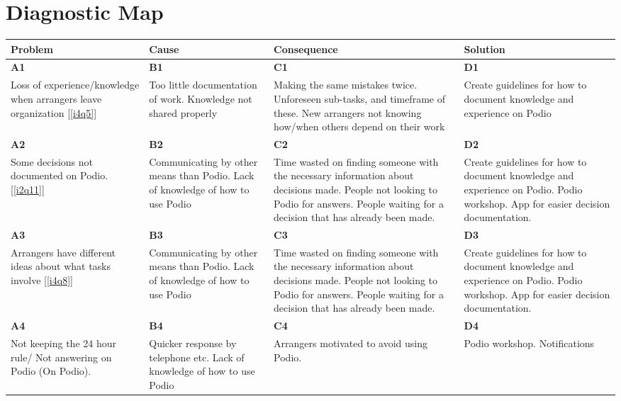 \section{Diagnostic Map} %
\label{sec:diagnostic_map}

\begin{tabular}{| p{3.5 cm} | p{3.5 cm} | p{3.5 cm} | p{3.5 cm} |}
  \hline                        
  \textbf{Problem} & \textbf{Cause} & \textbf{Consequence} & \textbf{Solution} \\ \hline
  \textbf{A1} & \textbf{B1} & \textbf{C1} & \textbf{D1} \\ 
  Loss of experience/knowledge when arrangers leave organization [\ref{i4q5}]
  & Too little documentation of work. Knowledge not shared properly 
  & Making the same mistakes twice. Unforeseen sub-tasks, and timeframe of these. New arrangers not knowing how/when others depend on their work
  &	Create guidelines for how to document knowledge and experience on Podio \\
  \hline
  \textbf{A2} & \textbf{B2} & \textbf{C2} & \textbf{D2} \\ 
  Some decisions not documented on Podio. [\ref{i2q11}]
  & Communicating by other means than Podio. Lack of knowledge of how to use Podio
  & Time wasted on finding someone with the necessary information about decisions made. People not looking to Podio for answers. People waiting for a decision that has already been made.
  & Create guidelines for how to document knowledge and experience on Podio. Podio workshop. App for easier decision documentation. \\
  \hline
  \textbf{A3} & \textbf{B3} & \textbf{C3} & \textbf{D3} \\ 
   Arrangers have different ideas about what tasks involve [\ref{i4q8}]
  & Communicating by other means than Podio. Lack of knowledge of how to use Podio
  & Time wasted on finding someone with the necessary information about decisions made. People not looking to Podio for answers. People waiting for a decision that has already been made.
  & Create guidelines for how to document knowledge and experience on Podio. Podio workshop. App for easier decision documentation. \\
  \hline
  \textbf{A4} & \textbf{B4} & \textbf{C4} & \textbf{D4} \\ 
  Not keeping the 24 hour rule/ Not answering on Podio (On Podio).
  & Quicker response by telephone etc. Lack of knowledge of how to use Podio
  & Arrangers motivated to avoid using Podio.
  & Podio workshop. Notifications \\

\end{tabular}
